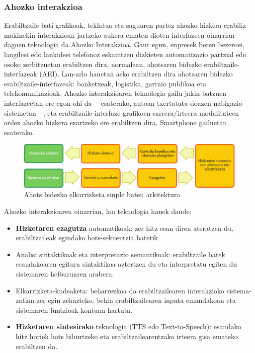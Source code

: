 \begin{multicols}{2}
\subsubsection{Ahozko interakzioa}
  Erabiltzaile bati grafikoak, teklatua eta saguaren partez ahozko hizkera erabiliz makinekin interakzioan jartzeko aukera ematen dioten interfazeen oinarrian dagoen teknologia da Ahozko Interakzioa. Gaur egun, enpresek beren bezeroei, langileei edo lankideei telefonoz eskaintzen dizkieten automatizazio partzial edo osoko zerbitzuetan erabiltzen dira, normalean, ahotsaren bidezko erabiltzaile-interfazeak (AEI). Lan-arlo hauetan asko erabiltzen dira ahotsaren bidezko erabiltzaile-interfazeak: banketxeak, logistika, garraio publikoa eta telekomunikazioak. Ahozko interakzioaren teknologia gailu jakin batzuen interfazeetan ere egon ohi da —esaterako, autoan txertatuta doazen nabigazio-sistemetan—, eta erabiltzaile-interfaze grafikoen sarrera/irteera modalitateen ordez ahozko hizkera ezartzeko ere erabiltzen dira, Smartphone gailuetan esaterako.


\begin{figure}[htb]
  \vspace{-9mm}
  \center  \includegraphics[width=\textwidth]{../_media/basque/simple_speech-based_dialogue_architecture}
  \center
  \caption{Ahots bidezko elkarrizketa sinple baten arkitektura}
  \label{fig:dialoguearch_eu}
\end{figure}

Ahozko interakzioaren oinarrian, lau teknologia hauek daude:

    \begin{itemize}
      \item \textbf{Hizketaren ezagutza} automatikoak: zer hitz esan diren ateratzen du, erabiltzaileak egindako hots-sekuentzia batetik.
      \item Analisi sintaktikoak eta interpretazio semantikoak: erabiltzaile batek esandakoaren egitura sintaktikoa aztertzen du eta interpretatu egiten du sistemaren helburuaren arabera.
      \item Elkarrizketa-kudeaketa: beharrezkoa da erabiltzailearen interakzioko sistema-zatian zer egin zehazteko, behin erabiltzailearen inputa emandakoan eta sistemaren funtzioak kontuan hartuta.
      \item \textbf{Hizketaren sintesirako} teknologia (TTS edo Text-to-Speech): esandako hitz horiek hots bihurtzeko eta erabiltzailearentzako irteera gisa emateko erabiltzen da. 


\end{itemize}
\end{multicols}

